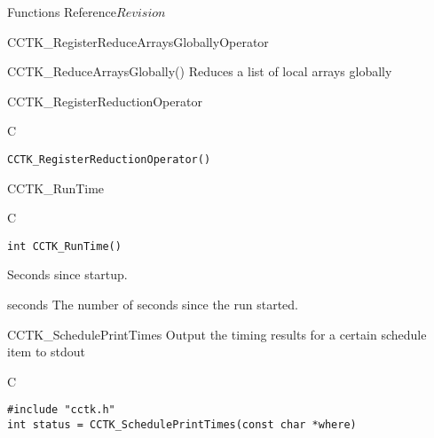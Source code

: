 \begin{cactuspart}{ Functions Reference}{}{$Revision$}
\begin{FunctionDescription}{CCTK\_RegisterReduceArraysGloballyOperator}
\begin{SeeAlsoSection}
\begin{SeeAlso}{CCTK\_ReduceArraysGlobally()}
Reduces a list of local arrays globally
\end{SeeAlso}
\end{SeeAlsoSection}
\end{FunctionDescription}

\begin{FunctionDescription}{CCTK\_RegisterReductionOperator}{}
\label{CCTK-RegisterReductionOperator}
\begin{SynopsisSection}
\begin{Synopsis}{C}
\begin{verbatim}CCTK_RegisterReductionOperator()\end{verbatim}
\end{Synopsis}
\end{SynopsisSection}
\end{FunctionDescription}

\begin{FunctionDescription}{CCTK\_RunTime}{}
\label{CCTK-RunTime}
\begin{SynopsisSection}
\begin{Synopsis}{C}
\begin{verbatim}int CCTK_RunTime()\end{verbatim}
\end{Synopsis}
Seconds since startup.
\end{SynopsisSection}
\begin{ResultSection}
\begin{Result}{seconds}
The number of seconds since the run started.
\end{Result}
\end{ResultSection}
\end{FunctionDescription}





\begin{FunctionDescription}{CCTK\_SchedulePrintTimes}
  \label{CCTK-SchedulePrintTimes}
  Output the timing results for a certain schedule item to stdout
  
  \begin{SynopsisSection}
    \begin{Synopsis}{C}
\begin{verbatim}
#include "cctk.h"
int status = CCTK_SchedulePrintTimes(const char *where)
\end{verbatim}
    \end{Synopsis}
  \end{SynopsisSection}
  

\end{FunctionDescription}
\end{cactuspart}
